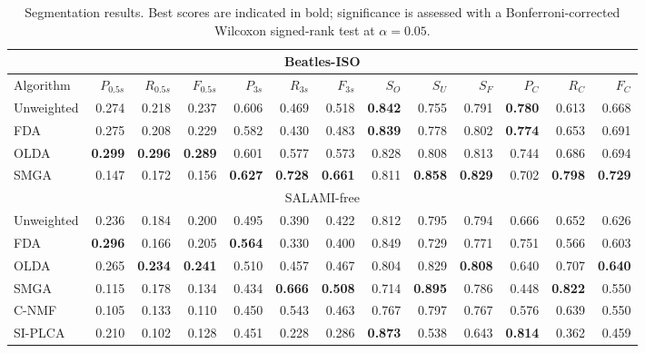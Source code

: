 \begin{table*}
\centering
\caption{Segmentation results. Best scores are indicated in bold; significance is assessed with a Bonferroni-corrected Wilcoxon
signed-rank test at $\alpha=0.05$.\label{tab:results}}
\footnotesize
\begin{tabular}{lrrrrrrrrrrrr}
\multicolumn{13}{c}{Beatles-ISO}\\
\toprule%
Algorithm   &   $P_{0.5s}$ & $R_{0.5s}$ & $F_{0.5s}$ & $P_{3s}$     & $R_{3s}$  & $F_{3s}$   & $S_O$ & $S_U$ & $S_F$ & $P_C$& $R_C$& $F_C$\\
\hline
Unweighted  & 
0.274 & 0.218 & 0.237 & 0.606 & 0.469 & 0.518 & \textbf{0.842} & 0.755 & 0.791 & \textbf{0.780} & 0.613 & 0.668\\
FDA         &  
0.275 & 0.208 & 0.229 & 0.582 & 0.430 & 0.483 & \textbf{0.839} & 0.778 & 0.802 & \textbf{0.774} & 0.653 & 0.691\\
OLDA        & 
\textbf{0.299} & \textbf{0.296} & \textbf{0.289} & 0.601 & 0.577 & 0.573 & 0.828 & 0.808 & 0.813 & 0.744 & 0.686 & 0.694\\
\hline
SMGA~\hfill\cite{serra2012unsupervised} &  
0.147 & 0.172 & 0.156 & \textbf{0.627} & \textbf{0.728} & \textbf{0.661} & 0.811 & \textbf{0.858} & \textbf{0.829} & 0.702 &
\textbf{0.798} & \textbf{0.729}\\
\toprule%
\multicolumn{13}{c}{SALAMI-free}\\
\toprule%
Unweighted  & 
0.236 & 0.184 & 0.200 & 0.495 & 0.390 & 0.422 & 0.812 & 0.795 & 0.794 & 0.666 & 0.652 & 0.626\\
FDA     & 
\textbf{0.296} & 0.166 & 0.205 & \textbf{0.564} & 0.330 & 0.400 & 0.849 & 0.729 & 0.771 & 0.751 & 0.566 & 0.603\\
OLDA    & 
0.265 & \textbf{0.234} & \textbf{0.241} & 0.510 & 0.457 & 0.467 & 0.804 & 0.829 & \textbf{0.808} & 0.640 & 0.707 & \textbf{0.640}\\
\hline
SMGA~\hfill\cite{serra2012unsupervised} &
0.115 & 0.178 & 0.134 & 0.434 & \textbf{0.666} & \textbf{0.508} & 0.714 & \textbf{0.895} & 0.786 & 0.448 & \textbf{0.822} & 0.550\\
C-NMF~\hfill\cite{nieto2013convex}  &
0.105 & 0.133 & 0.110 & 0.450 & 0.543 & 0.463 & 0.767 & 0.797 & 0.767 & 0.576 & 0.639 & 0.550\\
SI-PLCA~\hfill\cite{weiss2011unsupervised}  &
0.210 & 0.102 & 0.128 & 0.451 & 0.228 & 0.286 & \textbf{0.873} & 0.538 & 0.643 & \textbf{0.814} & 0.362 & 0.459\\
\bottomrule%
\end{tabular}
\end{table*}
